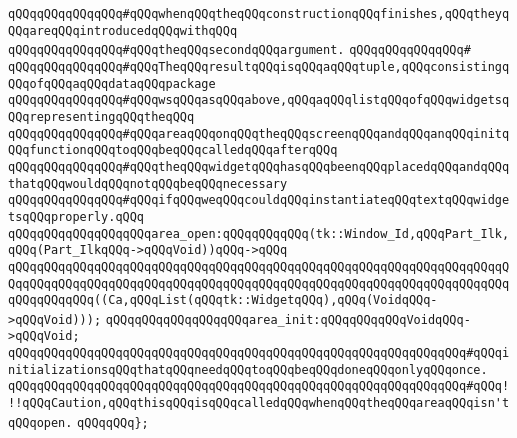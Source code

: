 \verb|qQQqqQQqqQQqqQQq#qQQqwhenqQQqtheqQQqconstructionqQQqfinishes,qQQqtheyqQQqareqQQqintroducedqQQqwithqQQq|\newline
\verb|qQQqqQQqqQQqqQQq#qQQqtheqQQqsecondqQQqargument.|\newline
\verb|qQQqqQQqqQQqqQQq#|\newline
\verb|qQQqqQQqqQQqqQQq#qQQqTheqQQqresultqQQqisqQQqaqQQqtuple,qQQqconsistingqQQqofqQQqaqQQqdataqQQqpackage|\newline
\verb|qQQqqQQqqQQqqQQq#qQQqwsqQQqasqQQqabove,qQQqaqQQqlistqQQqofqQQqwidgetsqQQqrepresentingqQQqtheqQQq|\newline
\verb|qQQqqQQqqQQqqQQq#qQQqareaqQQqonqQQqtheqQQqscreenqQQqandqQQqanqQQqinitqQQqfunctionqQQqtoqQQqbeqQQqcalledqQQqafterqQQq|\newline
\verb|qQQqqQQqqQQqqQQq#qQQqtheqQQqwidgetqQQqhasqQQqbeenqQQqplacedqQQqandqQQqthatqQQqwouldqQQqnotqQQqbeqQQqnecessary|\newline
\verb|qQQqqQQqqQQqqQQq#qQQqifqQQqweqQQqcouldqQQqinstantiateqQQqtextqQQqwidgetsqQQqproperly.qQQq|\newline
\newline
\verb|qQQqqQQqqQQqqQQqqQQqarea_open:qQQqqQQqqQQq(tk::Window_Id,qQQqPart_Ilk,qQQq(Part_IlkqQQq->qQQqVoid))qQQq->qQQq|\newline
\verb|qQQqqQQqqQQqqQQqqQQqqQQqqQQqqQQqqQQqqQQqqQQqqQQqqQQqqQQqqQQqqQQqqQQqqQQqqQQqqQQqqQQqqQQqqQQqqQQqqQQqqQQqqQQqqQQqqQQqqQQqqQQqqQQqqQQqqQQqqQQqqQQqqQQqqQQq((Ca,qQQqList(qQQqtk::WidgetqQQq),qQQq(VoidqQQq->qQQqVoid)));|\newline
\verb|qQQqqQQqqQQqqQQqqQQqarea_init:qQQqqQQqqQQqVoidqQQq->qQQqVoid;|\newline
\verb|qQQqqQQqqQQqqQQqqQQqqQQqqQQqqQQqqQQqqQQqqQQqqQQqqQQqqQQqqQQqqQQq#qQQqinitializationsqQQqthatqQQqneedqQQqtoqQQqbeqQQqdoneqQQqonlyqQQqonce.|\newline
\verb|qQQqqQQqqQQqqQQqqQQqqQQqqQQqqQQqqQQqqQQqqQQqqQQqqQQqqQQqqQQqqQQq#qQQq!!!qQQqCaution,qQQqthisqQQqisqQQqcalledqQQqwhenqQQqtheqQQqareaqQQqisn'tqQQqopen.|\newline
\newline
\newline
\newline
\newline
\verb|qQQqqQQq};|\newline
\newline
\newline
\newline
\newline
\newline
\newline
\newline
\newline
\newline

